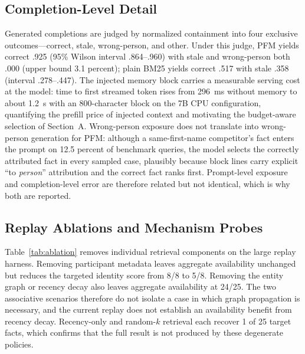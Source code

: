\documentclass[letterpaper]{article} %
\begin{document}
\subsection{Completion-Level Detail}

Generated completions are judged by normalized containment into four exclusive outcomes---correct, stale, wrong-person, and other. Under this judge, PFM yields correct .925 (95\% Wilson interval .864--.960) with stale and wrong-person both .000 (upper bound 3.1 percent); plain BM25 yields correct .517 with stale .358 (interval .278--.447). The injected memory block carries a measurable serving cost at the model: time to first streamed token rises from 296~ms without memory to about 1.2~s with an 800-character block on the 7B CPU configuration, quantifying the prefill price of injected context and motivating the budget-aware selection of Section~A. Wrong-person exposure does not translate into wrong-person generation for PFM: although a same-first-name competitor's fact enters the prompt on 12.5 percent of benchmark queries, the model selects the correctly attributed fact in every sampled case, plausibly because block lines carry explicit ``to \emph{person}'' attribution and the correct fact ranks first. Prompt-level exposure and completion-level error are therefore related but not identical, which is why both are reported.

\subsection{Replay Ablations and Mechanism Probes}

Table~\ref{tab:ablation} removes individual retrieval components on the large replay harness. Removing participant metadata leaves aggregate availability unchanged but reduces the targeted identity score from 8/8 to 5/8. Removing the entity graph or recency decay also leaves aggregate availability at 24/25. The two associative scenarios therefore do not isolate a case in which graph propagation is necessary, and the current replay does not establish an availability benefit from recency decay. Recency-only and random-$k$ retrieval each recover 1 of 25 target facts, which confirms that the full result is not produced by these degenerate policies.
\end{document}
